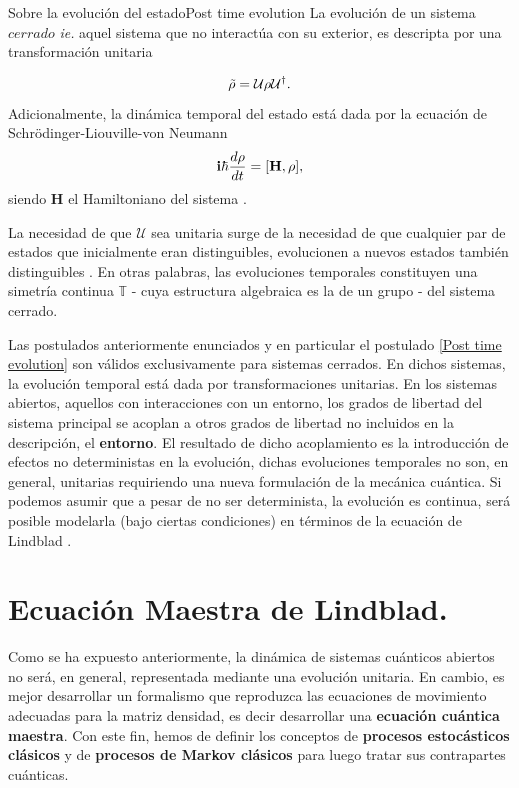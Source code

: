 \documentclass{report} %
\newcommand{\ie}{\textit{ie. }}
\numberwithin{equation}{section}
\begin{document}
\begin{post}{Sobre la evolución del estado}{Post time evolution}
La evolución de un sistema $cerrado$ \ie aquel sistema que no interactúa con su exterior, es descripta por una transformación unitaria 

\begin{equation}
    \Tilde{\rho} = \mathcal{U} \rho \mathcal{U}^{\dagger}.
    \label{state evolution}
\end{equation}
 Adicionalmente, la dinámica temporal del estado está dada por la ecuación de Schrödinger-Liouville-von Neumann 
 \begin{equation}
     {\bf i}\hbar \frac{d\rho}{dt} = [\mathbf{H},\rho],
     \label{Liouville eq}
 \end{equation}
  siendo $\mathbf{H}$ el Hamiltoniano del sistema \cite{HeinzPetruccione,PATHRIA2011115}.
  \label{Post time evolution}
\end{post}

La necesidad de que $\mathcal{U}$ sea unitaria surge de la necesidad de que cualquier par de estados que inicialmente eran distinguibles, evolucionen a nuevos estados también distinguibles
\cite{Nielsen.00,CohenTannoudji1989}. En otras palabras, las evoluciones temporales constituyen una simetría continua $\mathbb{T}$ - cuya estructura algebraica es la de un grupo - del sistema cerrado.

Las postulados anteriormente enunciados y en particular el postulado \ref{Post time evolution} son válidos exclusivamente para sistemas cerrados. En dichos sistemas, la evolución temporal está dada por transformaciones unitarias. En los sistemas abiertos, aquellos con interacciones con un entorno, los grados de libertad del sistema principal se acoplan a otros grados de libertad no incluidos en la descripción, el \textbf{entorno}. El resultado de dicho acoplamiento es la introducción de efectos no deterministas en la evolución, dichas evoluciones temporales no son, en general, unitarias requiriendo una nueva formulación de la mecánica cuántica. Si podemos asumir que a pesar de no ser determinista, la evolución es continua, será posible modelarla (bajo ciertas condiciones) en términos de la ecuación de Lindblad \cite{HeinzPetruccione}\cite{Lindblad1976}.

\section{Ecuaci\'on Maestra de Lindblad.} 

Como se ha expuesto anteriormente, la dinámica de sistemas cuánticos abiertos no será, en general, representada mediante una evolución unitaria. En cambio, es mejor desarrollar un formalismo que reproduzca las ecuaciones de movimiento adecuadas para la matriz densidad, es decir desarrollar una \textbf{ecuación cuántica maestra}. Con este fin, hemos de definir los conceptos de
 \textbf{procesos estocásticos clásicos} y de \textbf{procesos de Markov clásicos} para luego tratar sus contrapartes cuánticas.  
\end{document}
